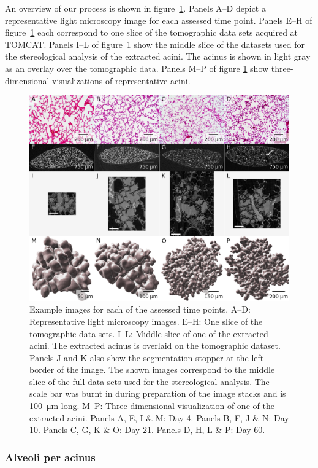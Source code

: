 \documentclass[
  american,
]{article}
\begin{document}
An overview of our process is shown in figure~\ref{fig:01}.
Panels A--D depict a representative light microscopy image for each assessed time point.
Panels E--H of figure~\ref{fig:01} each correspond to one slice of the tomographic data sets acquired at TOMCAT.
Panels I--L of figure~\ref{fig:01} show the middle slice of the datasets used for the stereological analysis of the extracted acini.
The acinus is shown in light gray as an overlay over the tomographic data.
Panels M--P of figure \ref{fig:01} show three-dimensional visualizations of representative acini.

\begin{figure}
\hypertarget{fig:01}{%
\centering
\includegraphics{images/fig01.png}
\caption{Example images for each of the assessed time points.
A--D: Representative light microscopy images.
E--H: One slice of the tomographic data sets.
I--L: Middle slice of one of the extracted acini.
The extracted acinus is overlaid on the tomographic dataset.
Panels J and K also show the segmentation stopper at the left border of the image.
The shown images correspond to the middle slice of the full data sets used for the stereological analysis.
The scale bar was burnt in during preparation of the image stacks and is 100~μm long.
M--P: Three-dimensional visualization of one of the extracted acini.
Panels A, E, I \& M: Day 4.
Panels B, F, J \& N: Day 10.
Panels C, G, K \& O: Day 21.
Panels D, H, L \& P: Day 60.}\label{fig:01}
}
\end{figure}

\hypertarget{alveoli-per-acinus}{%
\subsubsection{Alveoli per acinus}\label{alveoli-per-acinus}}
\end{document}
